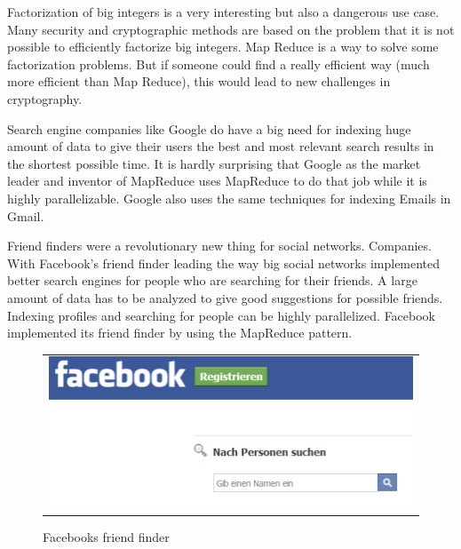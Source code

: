 Factorization of big integers is a very interesting but also a dangerous use case. Many security and
cryptographic methods are based on the problem that it is not possible to efficiently factorize big
integers. Map Reduce is a way to solve some factorization problems. But if someone could find a
really efficient way (much more efficient than Map Reduce), this would lead to new challenges in
cryptography.

Search engine companies like Google do have a big need for indexing huge amount of data to give
their users the best and most relevant search results in the shortest possible time. It is hardly
surprising that Google as the market leader and inventor of MapReduce uses MapReduce to do that job
while it is highly parallelizable. Google also uses the same techniques for indexing Emails in
Gmail.

Friend finders were a revolutionary new thing for social networks. Companies.  With Facebook’s
friend finder leading the way big social networks implemented better search engines for people who
are searching for their friends. A large amount of data has to be analyzed to give good suggestions
for possible friends. Indexing profiles and searching for people can be highly parallelized.
Facebook implemented its friend finder by using the MapReduce pattern.

\begin{figure} [!htb]
	\begin{center}
		  \begin{tabular}{@{}r@{}}
		{\includegraphics[width=14cm]{images/FacebookfriendFinder.png}}\\
 	 	 \end{tabular}
		\caption{Facebooks friend finder}
		\label{fig:friendFinder}
	\end{center}
\end{figure}
